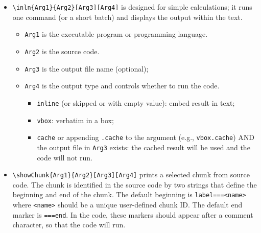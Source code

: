 \documentclass{ltxdoc}
\begin{document}
\begin{itemize}
\begin{itemize}
\item \texttt{Arg1} is the output file name, and it needs to have the same value
as that of \texttt{Arg3} in \texttt{\textbackslash{}runExtCode}. If an empty value is given to
\texttt{Arg1}, the counter \texttt{codeOutput} is used.
\item \texttt{Arg2} is optional and it controls the type of output with a default
value \texttt{vbox}.
\begin{itemize}
\item \texttt{vbox} (or skipped) = verbatim in a box;
\item \texttt{tex} = pure latex;
\item \texttt{inline} = embed result in text.
\end{itemize}
\end{itemize}

\item \texttt{\textbackslash{}inln\{Arg1\}\{Arg2\}[Arg3][Arg4]} is designed for simple calculations; it runs
one command (or a short batch) and displays the output within the
text.

\begin{itemize}
\item \texttt{Arg1} is the executable program or programming language.
\item \texttt{Arg2} is the source code.
\item \texttt{Arg3} is the output file name (optional);
\item \texttt{Arg4} is the output type and controls whether to run the code.
\begin{itemize}
\item \texttt{inline} (or skipped or with empty value): embed result in text;
\item \texttt{vbox}: verbatim in a box;
\item \texttt{cache} or appending \texttt{.cache} to the argument (e.g., \texttt{vbox.cache}) AND the
output file in \texttt{Arg3} exists: the cached result will be used and the code
will not run.
\end{itemize}
\end{itemize}

\item \texttt{\textbackslash{}showChunk\{Arg1\}\{Arg2\}[Arg3][Arg4]} prints a selected chunk from source
code. The chunk is identified in the source code by two strings that define
the beginning and end of the chunk. The default beginning is \texttt{label===<name>}
where \texttt{<name>} should be a unique user-defined chunk ID. The default end marker is
\texttt{===end}. In the code, these markers should appear after a comment character, so
that the code will run.


\end{itemize}
\end{document}
